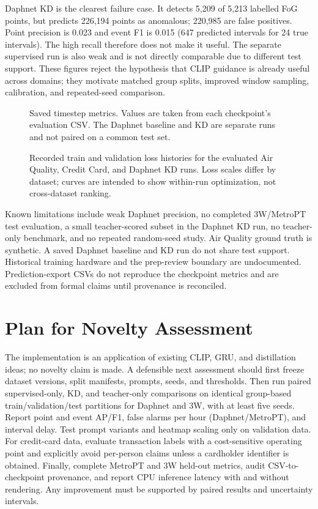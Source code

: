 \documentclass[twoside,english]{article}
\begin{document}
Daphnet KD is the clearest failure case. It detects 5,209 of 5,213 labelled FoG points, but predicts 226,194 points as anomalous; 220,985 are false positives. Point precision is 0.023 and event F1 is 0.015 (647 predicted intervals for 24 true intervals). The high recall therefore does not make it useful. The separate supervised run is also weak and is not directly comparable due to different test support. These figures reject the hypothesis that CLIP guidance is already useful across domains; they motivate matched group splits, improved window sampling, calibration, and repeated-seed comparison.

\begin{figure}[t]
\centering

\caption{Saved timestep metrics. Values are taken from each checkpoint's evaluation CSV. The Daphnet baseline and KD are separate runs and not paired on a common test set.}
\label{fig:performance}
\end{figure}

\begin{figure}[t]
\centering

\caption{Recorded train and validation loss histories for the evaluated Air Quality, Credit Card, and Daphnet KD runs. Loss scales differ by dataset; curves are intended to show within-run optimization, not cross-dataset ranking.}
\label{fig:curves}
\end{figure}

Known limitations include weak Daphnet precision, no completed 3W/MetroPT test evaluation, a small teacher-scored subset in the Daphnet KD run, no teacher-only benchmark, and no repeated random-seed study. Air Quality ground truth is synthetic. A saved Daphnet baseline and KD run do not share test support. Historical training hardware and the prep-review boundary are undocumented. Prediction-export CSVs do not reproduce the checkpoint metrics and are excluded from formal claims until provenance is reconciled.

\section{Plan for Novelty Assessment} \label{sec:Plan for Novelty Assessment}
The implementation is an application of existing CLIP, GRU, and distillation ideas; no novelty claim is made. A defensible next assessment should first freeze dataset versions, split manifests, prompts, seeds, and thresholds. Then run paired supervised-only, KD, and teacher-only comparisons on identical group-based train/validation/test partitions for Daphnet and 3W, with at least five seeds. Report point and event AP/F1, false alarms per hour (Daphnet/MetroPT), and interval delay. Test prompt variants and heatmap scaling only on validation data. For credit-card data, evaluate transaction labels with a cost-sensitive operating point and explicitly avoid per-person claims unless a cardholder identifier is obtained. Finally, complete MetroPT and 3W held-out metrics, audit CSV-to-checkpoint provenance, and report CPU inference latency with and without rendering. Any improvement must be supported by paired results and uncertainty intervals.
\end{document}

